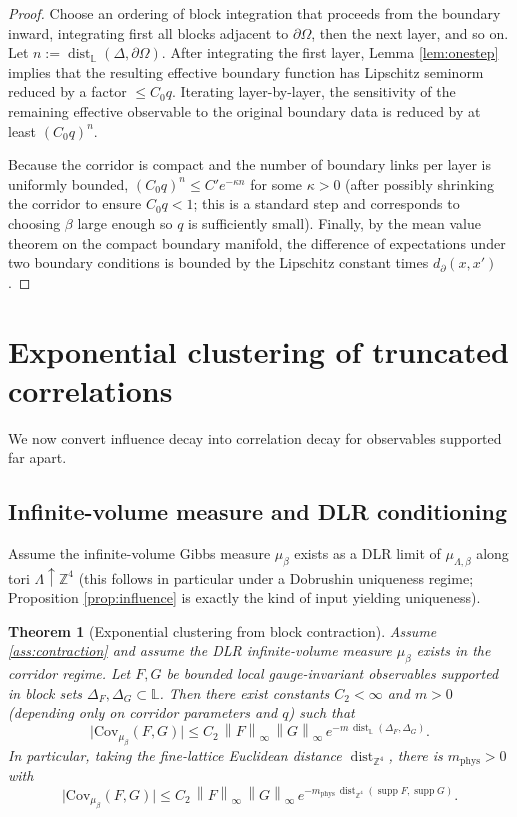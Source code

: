 \documentclass[11pt]{article}
\newtheorem{theorem}{Theorem}[section]
\theoremstyle{definition}
\newcommand{\Cov}{\mathrm{Cov}}
\newcommand{\1}{\mathbf{1}}
\newcommand{\dist}{\operatorname{dist}}
\newcommand{\supp}{\operatorname{supp}}
\newcommand{\norm}[1]{\left\lVert#1\right\rVert}
\begin{document}
\begin{proof}
Choose an ordering of block integration that proceeds from the boundary inward, integrating first all blocks adjacent to $\partial\Omega$, then the next layer, and so on. Let $n:=\dist_{\mathbb{L}}(\Delta,\partial\Omega)$. After integrating the first layer, Lemma \ref{lem:onestep} implies that the resulting effective boundary function has Lipschitz seminorm reduced by a factor $\le C_0 q$. Iterating layer-by-layer, the sensitivity of the remaining effective observable to the original boundary data is reduced by at least $(C_0 q)^n$.

Because the corridor is compact and the number of boundary links per layer is uniformly bounded, $(C_0 q)^n\le C' e^{-\kappa n}$ for some $\kappa>0$ (after possibly shrinking the corridor to ensure $C_0 q<1$; this is a standard step and corresponds to choosing $\beta$ large enough so $q$ is sufficiently small). Finally, by the mean value theorem on the compact boundary manifold, the difference of expectations under two boundary conditions is bounded by the Lipschitz constant times $d_\partial(x,x')$.
\end{proof}

\section{Exponential clustering of truncated correlations}

We now convert influence decay into correlation decay for observables supported far apart.

\subsection{Infinite-volume measure and DLR conditioning}
Assume the infinite-volume Gibbs measure $\mu_{\beta}$ exists as a DLR limit of $\mu_{\Lambda,\beta}$ along tori $\Lambda\uparrow\mathbb{Z}^4$ (this follows in particular under a Dobrushin uniqueness regime; Proposition \ref{prop:influence} is exactly the kind of input yielding uniqueness).

\begin{theorem}[Exponential clustering from block contraction]\label{thm:clustering}
Assume \ref{ass:contraction} and assume the DLR infinite-volume measure $\mu_{\beta}$ exists in the corridor regime. Let $F,G$ be bounded local gauge-invariant observables supported in block sets $\Delta_F,\Delta_G\subset\mathbb{L}$. Then there exist constants $C_2<\infty$ and $m>0$ (depending only on corridor parameters and $q$) such that
\begin{equation}\label{eq:cluster}
\big|\Cov_{\mu_{\beta}}(F,G)\big|
\le C_2\,\norm{F}_\infty\,\norm{G}_\infty\, e^{-m\,\dist_{\mathbb{L}}(\Delta_F,\Delta_G)}.
\end{equation}
In particular, taking the fine-lattice Euclidean distance $\dist_{\mathbb{Z}^4}$, there is $m_{\mathrm{phys}}>0$ with
\[
\big|\Cov_{\mu_{\beta}}(F,G)\big|\le C_2\,\norm{F}_\infty\,\norm{G}_\infty\, e^{-m_{\mathrm{phys}}\,\dist_{\mathbb{Z}^4}(\supp F,\supp G)}.
\]
\end{theorem}
\end{document}
